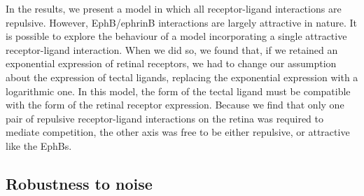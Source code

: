 \documentclass[9pt]{elife} %
\begin{document}
In the results, we present a model in which all receptor-ligand interactions are repulsive. However, EphB/ephrinB interactions are largely attractive in nature. It is possible to explore the behaviour of a model incorporating a single attractive receptor-ligand interaction.
When we did so, we found that, if we retained an exponential expression of retinal receptors, we had to change our assumption about the expression of tectal ligands, replacing the exponential expression with a logarithmic one.
In this model, the form of the tectal ligand must be compatible with the form of the retinal receptor expression.
Because we find that only one pair of repulsive receptor-ligand interactions on the retina was required to mediate competition, the other axis was free to be either repulsive, or attractive like the EphBs.

\subsection*{Robustness to noise}
\end{document}
